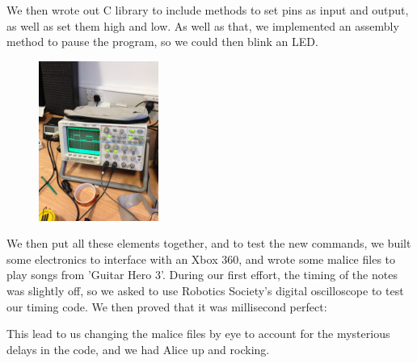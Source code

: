 \documentclass[11pt, notitlepage]{report}
\begin{document}
We then wrote out C library to include methods to set pins as input and output, as well as set them high and low. As well as that, we implemented an assembly method to pause the program, so we could then blink an LED.

\begin{figure}
  \vspace{-20pt}
  \begin{center}
    \includegraphics[width=0.35\textwidth, angle=270]{IMG_9458.JPG}
    \caption{}
  \end{center}
  \vspace{-10pt}
\end{figure}
We then put all these elements together, and to test the new commands, we built some electronics to interface with an Xbox 360, and wrote some malice files to play songs from 'Guitar Hero 3'. During our first effort, the timing of the notes was slightly off, so we asked to use Robotics Society's digital oscilloscope to test our timing code. We then proved that it was millisecond perfect:

This lead to us changing the malice files by eye to account for the mysterious delays in the code, and we had Alice up and rocking.
\end{document}
